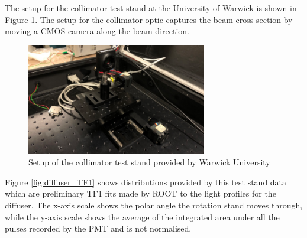 The setup for the collimator test stand at the University of Warwick is shown in Figure \ref{fig:coll_test_stand}.  The setup for the collimator optic captures the beam cross section by moving a CMOS camera along the beam direction. 

\begin{figure}
    \centering
    \includegraphics[width=0.7\textwidth]{Figures/coll_test_stand.png}
    \caption{Setup of the collimator test stand provided by Warwick University}
    \label{fig:coll_test_stand}
\end{figure}

Figure \ref{fig:diffuser_TF1} shows distributions provided by this test stand data which are preliminary TF1 fits made by ROOT to the light profiles for the diffuser.  The x-axis scale shows the polar angle the rotation stand moves through, while the y-axis scale shows the average of the integrated area under all the pulses recorded by the PMT and is not normalised. 


